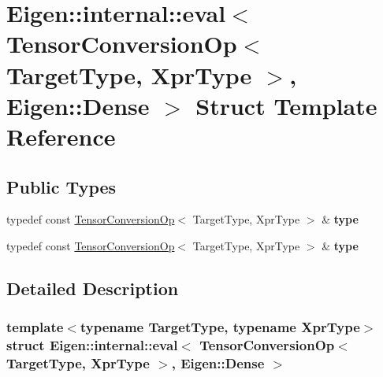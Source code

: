 \hypertarget{struct_eigen_1_1internal_1_1eval_3_01_tensor_conversion_op_3_01_target_type_00_01_xpr_type_01_4_00_01_eigen_1_1_dense_01_4}{}\section{Eigen\+:\+:internal\+:\+:eval$<$ Tensor\+Conversion\+Op$<$ Target\+Type, Xpr\+Type $>$, Eigen\+:\+:Dense $>$ Struct Template Reference}
\label{struct_eigen_1_1internal_1_1eval_3_01_tensor_conversion_op_3_01_target_type_00_01_xpr_type_01_4_00_01_eigen_1_1_dense_01_4}
\subsection*{Public Types}
\begin{DoxyCompactItemize}
\item 
\mbox{\label{struct_eigen_1_1internal_1_1eval_3_01_tensor_conversion_op_3_01_target_type_00_01_xpr_type_01_4_00_01_eigen_1_1_dense_01_4_ad9a473b57a39c4cd580f7a09c21a724e}} 
typedef const \hyperlink{class_eigen_1_1_tensor_conversion_op}{Tensor\+Conversion\+Op}$<$ Target\+Type, Xpr\+Type $>$ \& {\bfseries type}
\item 
\mbox{\label{struct_eigen_1_1internal_1_1eval_3_01_tensor_conversion_op_3_01_target_type_00_01_xpr_type_01_4_00_01_eigen_1_1_dense_01_4_ad9a473b57a39c4cd580f7a09c21a724e}} 
typedef const \hyperlink{class_eigen_1_1_tensor_conversion_op}{Tensor\+Conversion\+Op}$<$ Target\+Type, Xpr\+Type $>$ \& {\bfseries type}
\end{DoxyCompactItemize}


\subsection{Detailed Description}
\subsubsection*{template$<$typename Target\+Type, typename Xpr\+Type$>$\newline
struct Eigen\+::internal\+::eval$<$ Tensor\+Conversion\+Op$<$ Target\+Type, Xpr\+Type $>$, Eigen\+::\+Dense $>$}



